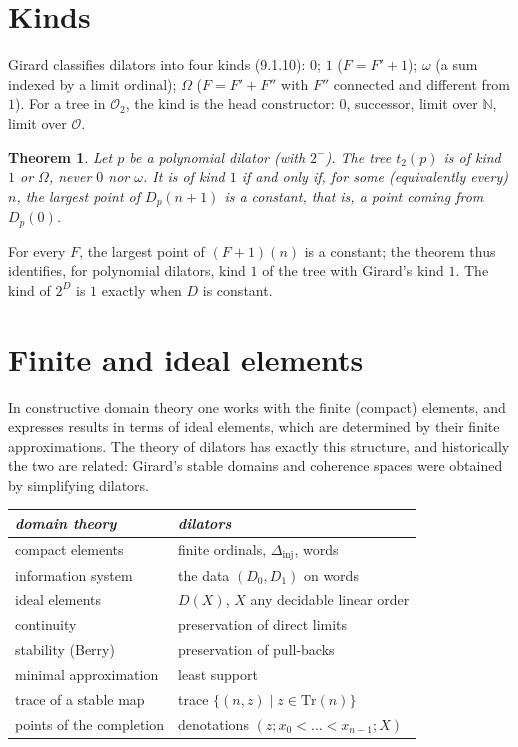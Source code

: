 \documentclass[11pt,a4paper]{article}
\newtheorem{theorem}{Theorem}[section]
\theoremstyle{definition}
\theoremstyle{remark}
\newcommand{\Dinj}{\Delta_{\mathrm{inj}}}
\newcommand{\Tr}{\mathrm{Tr}}
\newcommand{\N}{\mathbb{N}}
\begin{document}
\section{Kinds}

Girard classifies dilators into four kinds (9.1.10): $0$; $1$ ($F = F' +
1$); $\omega$ (a sum indexed by a limit ordinal); $\Omega$ ($F = F' + F''$
with $F''$ connected and different from $1$). For a tree in $\mathcal
O_2$, the kind is the head constructor: $0$, successor, limit over $\N$,
limit over $\mathcal O$.

\begin{theorem}
Let $p$ be a polynomial dilator (with $2^-$). The tree $t_2(p)$ is of kind
$1$ or $\Omega$, never $0$ nor $\omega$. It is of kind $1$ if and only if,
for some (equivalently every) $n$, the largest point of $D_p(n+1)$ is a
constant, that is, a point coming from $D_p(0)$.
\end{theorem}

For every $F$, the largest point of $(F + 1)(n)$ is a constant; the
theorem thus identifies, for polynomial dilators, kind $1$ of the tree
with Girard's kind $1$. The kind of $2^D$ is $1$ exactly when $D$ is
constant.

\section{Finite and ideal elements}

In constructive domain theory one works with the finite (compact)
elements, and expresses results in terms of ideal elements, which are
determined by their finite approximations. The theory of dilators has
exactly this structure, and historically the two are related: Girard's
stable domains and coherence spaces were obtained by simplifying
dilators.

\medskip
\begin{tabular}{ll}
\emph{domain theory} & \emph{dilators} \\ \hline
compact elements & finite ordinals, $\Dinj$, words \\
information system & the data $(D_0, D_1)$ on words \\
ideal elements & $D(X)$, $X$ any decidable linear order \\
continuity & preservation of direct limits \\
stability (Berry) & preservation of pull-backs \\
minimal approximation & least support \\
trace of a stable map & trace $\{(n, z) \mid z \in \Tr(n)\}$ \\
points of the completion & denotations $(z; x_0 < \dots < x_{n-1}; X)$
\end{tabular}
\end{document}

